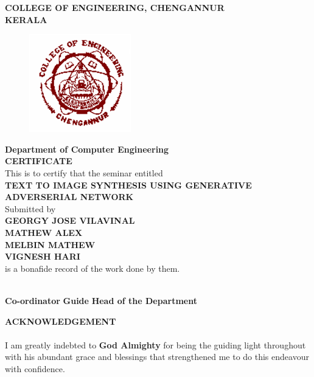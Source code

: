 \documentclass[a4paper,12pt,oneside]{article}
\begin{document}
\newpage
\thispagestyle{empty}
\begin{center}
\setlength{\baselineskip}{1.5\baselineskip}
{\large\textbf{COLLEGE OF ENGINEERING, CHENGANNUR}}
\\
{\large\textbf{KERALA}}
\\
\begin{figure}[H]
\centering
\includegraphics{ceclogo.png}
\end{figure}
\setlength{\baselineskip}{1.5\baselineskip}
\textbf{Department of Computer Engineering}
\\
\textbf{CERTIFICATE}
\\
This is to certify that the seminar entitled
\\
\textbf{TEXT TO IMAGE SYNTHESIS USING GENERATIVE ADVERSERIAL NETWORK}
\\
Submitted by
\\
\textbf{GEORGY JOSE VILAVINAL}
\\
\textbf{MATHEW ALEX}
\\
\textbf{MELBIN MATHEW}
\\
\textbf{VIGNESH HARI}
\\
is a bonafide record of the work done by them.
\end{center}
\vspace{20ex}
\hspace{55ex}
\\

\hspace{0ex}
\textbf{Co-ordinator}
\hspace{18ex}
\textbf{Guide}
\hspace{18ex}
\textbf{Head of the Department}
\newpage
{}
\renewcommand{\headrulewidth}{0.0pt}
\renewcommand{\footrulewidth}{0.0pt}
\begin{center}
\large{\textbf{ACKNOWLEDGEMENT}}
\end{center}
\vspace{6ex}
\setlength{\baselineskip}{1.5\baselineskip}
\paragraph{}
I am greatly indebted to \textbf{God Almighty} for being the guiding light throughout with his
abundant grace and blessings that strengthened me to do this endeavour with confidence.
\end{document}
